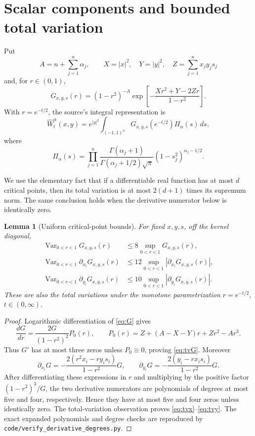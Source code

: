 \documentclass[11pt]{article}
\newtheorem{lemma}{Lemma}
\newcommand{\W}{\widehat W}
\begin{document}
\section{Scalar components and bounded total variation}

Put
\[
 A=n+\sum_{j=1}^n\alpha_j,\qquad
 X=|x|^2,\quad Y=|y|^2,\quad Z=\sum_{j=1}^n x_jy_js_j
\]
and, for $r\in(0,1)$,
\begin{equation}\label{eq:G}
 G_{x,y,s}(r)=(1-r^2)^{-A}
 \exp\!\left[-\frac{Xr^2+Y-2Zr}{1-r^2}\right].
\end{equation}
With $r=e^{-t/2}$, the source's integral representation is
\begin{equation}\label{eq:kernel}
 \W_t^\alpha(x,y)=e^{|y|^2}\int_{(-1,1)^n}
 G_{x,y,s}(e^{-t/2})\Pi_\alpha(s)\,ds,
\end{equation}
where
\[
 \Pi_\alpha(s)=\prod_{j=1}^n
 \frac{\Gamma(\alpha_j+1)}{\Gamma(\alpha_j+1/2)\sqrt\pi}
 (1-s_j^2)^{\alpha_j-1/2}.
\]

We use the elementary fact that if a differentiable real function has at most
$d$ critical points, then its total variation is at most
$2(d+1)$ times its supremum norm.  The same conclusion holds when the
derivative numerator below is identically zero.

\begin{lemma}[Uniform critical-point bounds]\label{lem:critical}
For fixed $x,y,s$, off the kernel diagonal,
\begin{align}
 \operatorname{Var}_{0<r<1}G_{x,y,s}(r)&\leq 8\sup_{0<r<1}G_{x,y,s}(r),\label{eq:tvG}\\
 \operatorname{Var}_{0<r<1}\partial_{x_i}G_{x,y,s}(r)
 &\leq 12\sup_{0<r<1}|\partial_{x_i}G_{x,y,s}(r)|,\label{eq:tvx}\\
 \operatorname{Var}_{0<r<1}\partial_{y_i}G_{x,y,s}(r)
 &\leq 10\sup_{0<r<1}|\partial_{y_i}G_{x,y,s}(r)|.\label{eq:tvy}
\end{align}
These are also the total variations under the monotone parametrization
$r=e^{-t/2}$, $t\in(0,\infty)$.
\end{lemma}

\begin{proof}
Logarithmic differentiation of \eqref{eq:G} gives
\begin{equation}\label{eq:P0}
 \frac{dG}{dr}=\frac{2G}{(1-r^2)^2}P_0(r),\qquad
 P_0(r)=Z+(A-X-Y)r+Zr^2-Ar^3.
\end{equation}
Thus $G'$ has at most three zeros unless $P_0\equiv0$, proving
\eqref{eq:tvG}.  Moreover
\begin{equation}\label{eq:spatial}
 \partial_{x_i}G=-\frac{2(r^2x_i-ry_is_i)}{1-r^2}G,\qquad
 \partial_{y_i}G=-\frac{2(y_i-rx_is_i)}{1-r^2}G.
\end{equation}
After differentiating these expressions in $r$ and multiplying by the positive
factor $(1-r^2)^3/G$, the two derivative numerators are polynomials of degrees
at most five and four, respectively.  Hence they have at most five and four
zeros unless identically zero.  The total-variation observation proves
\eqref{eq:tvx}--\eqref{eq:tvy}.  The exact expanded polynomials and degree
checks are reproduced by \texttt{code/verify\_derivative\_degrees.py}.
\end{proof}
\end{document}
